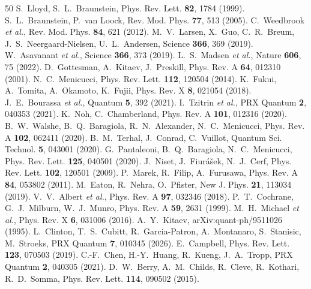 \documentclass[12pt]{iopart}
\begin{document}
\begin{thebibliography}{50}
 S.~Lloyd, S.~L.~Braunstein, Phys. Rev. Lett.
\textbf{82}, 1784 (1999).
 S.~L.~Braunstein, P.~van Loock, Rev. Mod. Phys.
\textbf{77}, 513 (2005).
 C.~Weedbrook \emph{et al.}, Rev. Mod. Phys.
\textbf{84}, 621 (2012).
 M.~V.~Larsen, X.~Guo, C.~R.~Breum,
J.~S.~Neergaard-Nielsen, U.~L.~Andersen, Science \textbf{366}, 369 (2019).
 W.~Asavanant \emph{et al.}, Science \textbf{366},
373 (2019).
 L.~S.~Madsen \emph{et al.}, Nature \textbf{606}, 75
(2022).
 D.~Gottesman, A.~Kitaev, J.~Preskill, Phys. Rev. A
\textbf{64}, 012310 (2001).
 N.~C.~Menicucci, Phys. Rev. Lett. \textbf{112},
120504 (2014).
 K.~Fukui, A.~Tomita, A.~Okamoto, K.~Fujii, Phys. Rev. X
\textbf{8}, 021054 (2018).
 J.~E.~Bourassa \emph{et al.}, Quantum \textbf{5}, 392
(2021).
 I.~Tzitrin \emph{et al.}, PRX Quantum \textbf{2},
040353 (2021).
 K.~Noh, C.~Chamberland, Phys. Rev. A \textbf{101}, 012316
(2020).
 B.~W.~Walshe, B.~Q.~Baragiola, R.~N.~Alexander,
N.~C.~Menicucci, Phys. Rev. A \textbf{102}, 062411 (2020).
 B.~M.~Terhal, J.~Conrad, C.~Vuillot, Quantum Sci.
Technol. \textbf{5}, 043001 (2020).
 G.~Pantaleoni, B.~Q.~Baragiola, N.~C.~Menicucci,
Phys. Rev. Lett. \textbf{125}, 040501 (2020).
 J.~Niset, J.~Fiur\'a\v{s}ek, N.~J.~Cerf, Phys. Rev. Lett.
\textbf{102}, 120501 (2009).
 P.~Marek, R.~Filip, A.~Furusawa, Phys. Rev. A
\textbf{84}, 053802 (2011).
 M.~Eaton, R.~Nehra, O.~Pfister, New J. Phys.
\textbf{21}, 113034 (2019).
 V.~V.~Albert \emph{et al.}, Phys. Rev. A \textbf{97},
032346 (2018).
 P.~T.~Cochrane, G.~J.~Milburn, W.~J.~Munro, Phys.
Rev. A \textbf{59}, 2631 (1999).
 M.~H.~Michael \emph{et al.}, Phys. Rev. X \textbf{6},
031006 (2016).
 A.~Y.~Kitaev, arXiv:quant-ph/9511026 (1995).
 L.~Clinton, T.~S.~Cubitt, R.~Garcia-Patron,
A.~Montanaro, S.~Stanisic, M.~Stroeks, PRX Quantum \textbf{7}, 010345 (2026).
 E.~Campbell, Phys. Rev. Lett. \textbf{123}, 070503
(2019).
 C.-F.~Chen, H.-Y.~Huang, R.~Kueng, J.~A.~Tropp, PRX
Quantum \textbf{2}, 040305 (2021).
 D.~W.~Berry, A.~M.~Childs, R.~Cleve, R.~Kothari,
R.~D.~Somma, Phys. Rev. Lett. \textbf{114}, 090502 (2015).

\end{thebibliography}
\end{document}
